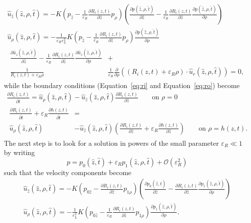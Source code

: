\documentclass{frontiers_suppmat} %
\newcommand{\dd}{\partial}
\newcommand{\vareps}{\varepsilon}
\newcommand{\hatz}{\hat{z}}
\newcommand{\hatt}{\hat{t}}
\begin{document}
\begin{gather}
\hat{u}_{\hatz}(\hatz,\rho,\hatt) = -K(p_{\hatz} - \frac{1}{\vareps_R} \frac{\dd R_i(z,t)}{\dd \hatz} p_{\rho}) \left( \frac{\dd p(\hatz,\rho,\hatt)}{\dd \hatz} - \frac{1}{\vareps_R} \frac{\dd R_i(z,t)}{\dd \hatz} \frac{\dd p(\hatz,\rho,\hatt)}{\dd \rho} \right)\\
\hat{u}_{\rho}(\hatz,\rho,\hatt) = - \frac{1}{\vareps_R \vareps_L^2} K(p_{\hatz} - \frac{1}{\vareps_R} \frac{\dd R_i(z,t)}{\dd \hatz} p_{\rho}) \frac{\dd p(\hatz,\rho,\hatt)}{\dd \rho}\\
\begin{split}
\frac{\dd \hat{u}_z(\hatz,\rho,\hatt)}{\dd \hatz} - \frac{1}{\vareps_R} \frac{\dd R_i(z,t)}{\dd \hatz} \frac{\dd \hat{u}_z(\hatz,\rho,\hatt)}{\dd \rho} &+\\
\frac{1}{R_i(z,t) + \vareps_R \rho} & \frac{1}{\vareps_R} \frac{\dd}{\dd \rho} \left( \left( R_i(z,t) + \vareps_R \rho \right) \cdot \hat{u}_r(\hatz,\rho,\hatt) \right) = 0,
\end{split}
\end{gather}
while the boundary conditions (Equation~\ref{eq:ri} and Equation~\ref{eq:ro}) become
\begin{gather}
\frac{\dd R_i(z,t)}{\dd \hatt} = \hat{u}_{\rho}(\hatz,\rho,\hatt) - \hat{u}_{\hatz}(\hatz,\rho,\hatt) \frac{\dd R_i(z,t)}{\dd \hatz} \qquad \text{on } \rho = 0\\
\begin{split}
\frac{\dd R_i(z,t)}{\dd \hatt} + \vareps_R \frac{\dd h(z,t)}{\dd \hatt} &=\\
\hat{u}_{\rho}(\hatz,\rho,\hatt) &- \hat{u}_{\hatz}(\hatz,\rho,\hatt) \left( \frac{\dd R_i(z,t)}{\dd \hatz} + \vareps_R \frac{\dd h(z,t)}{\dd \hatz} \right) \qquad \text{on } \rho = h(z,t).
\end{split}
\end{gather}
The next step is to look for a solution in powers of the small parameter $\vareps_R \ll 1$ by writing
\[
p = p_0(\hatz,\hatt) + \vareps_R p_1(\hatz,\rho,\hatt) + \mathcal{O}(\vareps_R^2)
\]
such that the velocity components become
\begin{gather}
\hat{u}_{\hatz}(\hatz,\rho,\hatt) = -K(p_{0\hatz} - \frac{\dd R_i(z,t)}{\dd \hatz} p_{1\rho}) \left( \frac{\dd p_0(\hatz,\hatt)}{\dd \hatz} - \frac{\dd R_i(z,t)}{\dd \hatz} \frac{\dd p_1(\hatz,\rho,\hatt)}{\dd \rho} \right)\label{eq:uz_leading}\\
\hat{u}_{\rho}(\hatz,\rho,\hatt) = - \frac{1}{\vareps_L^2} K(p_{0\hatz} - \frac{1}{\vareps_R} \frac{\dd R_i(z,t)}{\dd \hatz} p_{1\rho}) \frac{\dd p_1(\hatz,\rho,\hatt)}{\dd \rho}\label{eq:ur_leading}.
\end{gather}
\end{document}
